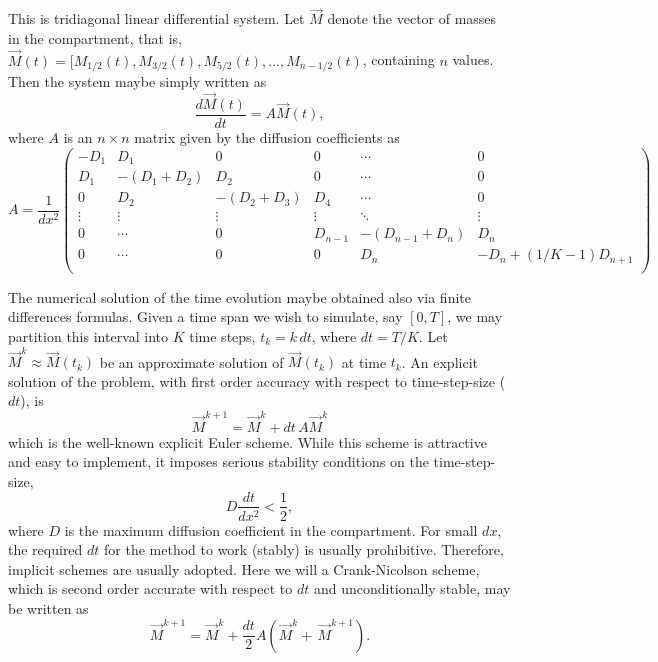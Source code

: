 \documentclass[final,1p,times]{elsarticle}
\begin{document}
This is tridiagonal linear differential system. Let $\vec{M}$ denote the vector of masses in the compartment, that is,
$\vec{M}(t)=[M_{1/2}(t), M_{3/2}(t), M_{5/2}(t), ..., M_{n-1/2}(t)$, containing $n$ values. Then the system maybe simply written as
\begin{equation}
\frac{d \vec{M}(t)}{dt}=A\vec{M}(t),
\end{equation}
where $A$ is an $n\times n$ matrix given by the diffusion coefficients as
\begin{equation}
A=
\frac{1}{dx^2}
\begin{pmatrix}
-D_1 & D_1 & 0 & 0& \cdots & 0 \\
D_1 & -(D_1+D_2) & D_2 & 0 & \cdots & 0 \\
0 & D_2 & -(D_2+D_3) & D_4 & \cdots & 0 \\
\vdots  & \vdots & \vdots & \vdots & \ddots & \vdots  \\
0 & \cdots & 0 & D_{n-1} & -(D_{n-1}+D_n) & D_n \\
0 & \cdots & 0 & 0 & D_n & -D_n+(1/K-1)D_{n+1} \\
\end{pmatrix}
\end{equation}

The numerical solution of the time evolution maybe obtained also via finite differences formulas. Given a time span we wish to simulate, say $[0,T]$, we may partition this interval into $K$ time steps, $t_k=k\, dt$, where $dt=T/K$. Let $\vec{M}^k\approx  \vec{M}(t_k)$ be an approximate solution of $\vec{M}(t_k)$ at time $t_k$. An explicit solution of the problem, with first order accuracy with respect to time-step-size ($dt$), is
\begin{equation}
\vec{M}^{k+1}=\vec{M}^k+dt \,A\vec{M}^k
\end{equation}
which is the well-known explicit Euler scheme. While this scheme is attractive and easy to implement, it imposes serious stability conditions on the time-step-size, 
\begin{equation}
D\frac{dt}{dx^2}<\frac{1}{2},
\end{equation} 
where $D$ is the maximum diffusion coefficient in the compartment. For small $dx$, the required $dt$ for the method to work (stably) is usually prohibitive. Therefore, implicit schemes are usually adopted. Here we will a Crank-Nicolson scheme, which is second order accurate with respect to $dt$ and unconditionally stable, may be written as
\begin{equation}
\vec{M}^{k+1}=\vec{M}^k+\frac{dt}{2}A\left(\vec{M}^k+\,\vec{M}^{k+1}\right).
\end{equation}
\end{document}

